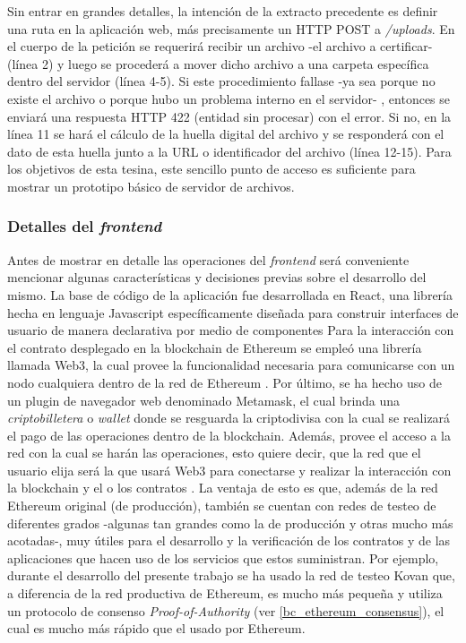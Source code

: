 Sin entrar en grandes detalles, la intención de la extracto precedente es definir una ruta en la aplicación web, más precisamente un HTTP POST a \textit{/uploads}. En el cuerpo de la petición se requerirá recibir un archivo -el archivo a certificar- (línea 2) y luego se procederá a mover dicho archivo a una carpeta específica dentro del servidor (línea 4-5). Si este procedimiento fallase -ya sea porque no existe el archivo o porque hubo un problema interno en el servidor- , entonces se enviará una respuesta HTTP 422 (entidad sin procesar) con el error. Si no, en la línea 11 se hará el cálculo de la huella digital del archivo y se responderá con el dato de esta huella junto a la URL o identificador del archivo (línea 12-15).
Para los objetivos de esta tesina, este sencillo punto de acceso es suficiente para mostrar un prototipo básico de servidor de archivos.

\subsubsection{Detalles del \textit{frontend}}

Antes de mostrar en detalle las operaciones del \textit{frontend} será conveniente mencionar algunas características y decisiones previas sobre el desarrollo del mismo.
La base de código de la aplicación fue desarrollada en React, una librería hecha en lenguaje Javascript específicamente diseñada para construir interfaces de usuario de manera declarativa por medio de componentes \cite{React2018}
Para la interacción con el contrato desplegado en la blockchain de Ethereum se empleó una librería llamada Web3, la cual provee la funcionalidad necesaria para comunicarse con un nodo cualquiera dentro de la red de Ethereum \cite{Web32018}.
Por último, se ha hecho uso de un plugin de navegador web denominado Metamask, el cual brinda una \textit{criptobilletera} o \textit{wallet} donde se resguarda la criptodivisa con la cual se realizará el pago de las operaciones dentro de la blockchain. Además, provee el acceso a la red con la cual se harán las operaciones, esto quiere decir, que la red que el usuario elija será la que usará Web3 para conectarse y realizar la interacción con la blockchain y el o los contratos \cite{Metamask2018}. La ventaja de esto es que, además de la red Ethereum original (de producción), también se cuentan con redes de testeo de diferentes grados -algunas tan grandes como la de producción y otras mucho más acotadas-, muy útiles para el desarrollo y la verificación de los contratos y de las aplicaciones que hacen uso de los servicios que estos suministran. Por ejemplo, durante el desarrollo del presente trabajo se ha usado la red de testeo Kovan que, a diferencia de la red productiva de Ethereum, es mucho más pequeña y utiliza un protocolo de consenso \textit{Proof-of-Authority} (ver \ref{bc_ethereum_consensus}), el cual es mucho más rápido que el usado por Ethereum.

